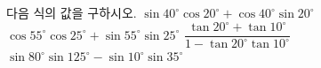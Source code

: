 다음 식의 값을 구하시오.
 $\sin 40^\circ\cos 20^\circ+\cos 40^\circ\sin 20^\circ$
 $\cos 55^\circ\cos 25^\circ+\sin 55^\circ\sin 25^\circ$
 $\dfrac{\tan 20^\circ+\tan 10^\circ}{1-\tan 20^\circ\tan 10^\circ}$
 $\sin 80^\circ\sin 125^\circ-\sin 10^\circ\sin 35^\circ$

